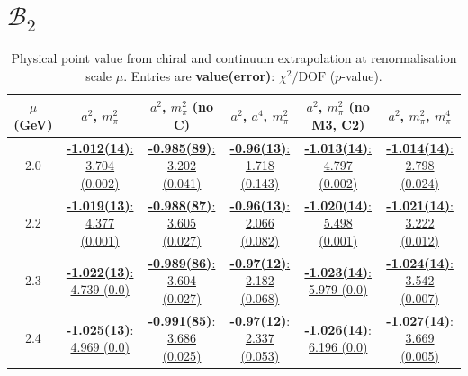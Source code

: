 \documentclass[12pt]{extarticle}
\begin{document}
\section{$\mathcal{B}_2$}
\begin{table}[h!]
\begin{center}
\begin{tabular}{|c|c|c|c|c|c|}
\hline
$\mu$ (GeV) & $a^2$, $m_\pi^2$& $a^2$, $m_\pi^2$ (no C)& $a^2$, $a^4$, $m_\pi^2$& $a^2$, $m_\pi^2$ (no M3, C2)& $a^2$, $m_\pi^2$, $m_\pi^4$\\
\hline
2.0& \hyperlink{VVmAA/NPR/a2m2_20.pdf.1}{\textbf{-1.012(14)}: 3.704 (0.002)} & \hyperlink{VVmAA/NPR/a2m2noC_20.pdf.1}{\textbf{-0.985(89)}: 3.202 (0.041)} & \hyperlink{VVmAA/NPR/a2a4m2_20.pdf.1}{\textbf{-0.96(13)}: 1.718 (0.143)} & \hyperlink{VVmAA/NPR/a2m2mcut_20.pdf.1}{\textbf{-1.013(14)}: 4.797 (0.002)} & \hyperlink{VVmAA/NPR/a2m2m4_20.pdf.1}{\textbf{-1.014(14)}: 2.798 (0.024)}\\
2.2& \hyperlink{VVmAA/NPR/a2m2_22.pdf.1}{\textbf{-1.019(13)}: 4.377 (0.001)} & \hyperlink{VVmAA/NPR/a2m2noC_22.pdf.1}{\textbf{-0.988(87)}: 3.605 (0.027)} & \hyperlink{VVmAA/NPR/a2a4m2_22.pdf.1}{\textbf{-0.96(13)}: 2.066 (0.082)} & \hyperlink{VVmAA/NPR/a2m2mcut_22.pdf.1}{\textbf{-1.020(14)}: 5.498 (0.001)} & \hyperlink{VVmAA/NPR/a2m2m4_22.pdf.1}{\textbf{-1.021(14)}: 3.222 (0.012)}\\
2.3& \hyperlink{VVmAA/NPR/a2m2_23.pdf.1}{\textbf{-1.022(13)}: 4.739 (0.0)} & \hyperlink{VVmAA/NPR/a2m2noC_23.pdf.1}{\textbf{-0.989(86)}: 3.604 (0.027)} & \hyperlink{VVmAA/NPR/a2a4m2_23.pdf.1}{\textbf{-0.97(12)}: 2.182 (0.068)} & \hyperlink{VVmAA/NPR/a2m2mcut_23.pdf.1}{\textbf{-1.023(14)}: 5.979 (0.0)} & \hyperlink{VVmAA/NPR/a2m2m4_23.pdf.1}{\textbf{-1.024(14)}: 3.542 (0.007)}\\
2.4& \hyperlink{VVmAA/NPR/a2m2_24.pdf.1}{\textbf{-1.025(13)}: 4.969 (0.0)} & \hyperlink{VVmAA/NPR/a2m2noC_24.pdf.1}{\textbf{-0.991(85)}: 3.686 (0.025)} & \hyperlink{VVmAA/NPR/a2a4m2_24.pdf.1}{\textbf{-0.97(12)}: 2.337 (0.053)} & \hyperlink{VVmAA/NPR/a2m2mcut_24.pdf.1}{\textbf{-1.026(14)}: 6.196 (0.0)} & \hyperlink{VVmAA/NPR/a2m2m4_24.pdf.1}{\textbf{-1.027(14)}: 3.669 (0.005)}\\
\hline
\end{tabular}
\caption{Physical point value from chiral and continuum extrapolation at renormalisation scale $\mu$. Entries are \textbf{value(error)}: $\chi^2/\text{DOF}$ ($p$-value).}
\end{center}
\end{table}
\end{document}
